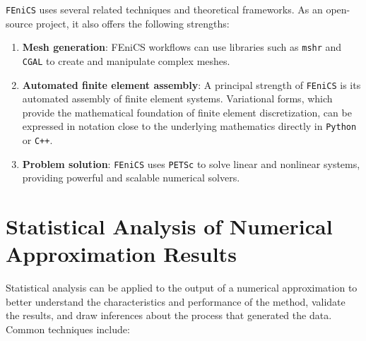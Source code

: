 \documentclass[a4paper]{article}
\begin{document}
\texttt{FEniCS} uses several related techniques and theoretical frameworks. As an open-source project, it also offers the following strengths:
\begin{enumerate}
  \item \textbf{Mesh generation}: FEniCS workflows can use libraries such as \texttt{mshr} and \texttt{CGAL} to create and manipulate complex meshes.
  \item \textbf{Automated finite element assembly}: A principal strength of \texttt{FEniCS} is its automated assembly of finite element systems. Variational forms, which provide the mathematical foundation of finite element discretization, can be expressed in notation close to the underlying mathematics directly in \texttt{Python} or \texttt{C++}.
  \item \textbf{Problem solution}: \texttt{FEniCS} uses \texttt{PETSc} to solve linear and nonlinear systems, providing powerful and scalable numerical solvers.
\end{enumerate}

\section{Statistical Analysis of Numerical Approximation Results}

Statistical analysis can be applied to the output of a numerical approximation to better understand the characteristics and performance of the method, validate the results, and draw inferences about the process that generated the data. Common techniques include:
\end{document}
